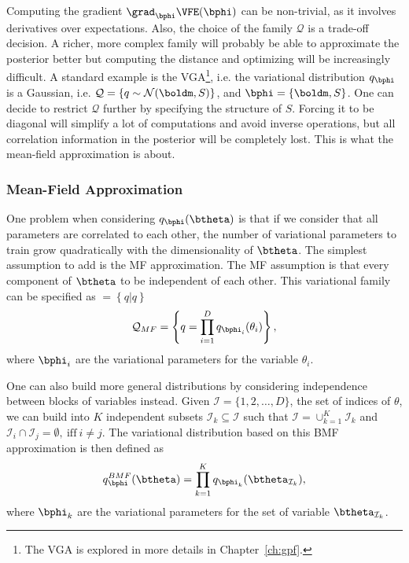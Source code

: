 Computing the gradient $\grad_{\bphi}\VFE(\bphi)$ can be non-trivial, as it involves derivatives over expectations.
Also, the choice of the family $\mathcal{Q}$ is a trade-off decision.
A richer, more complex family will probably be able to approximate the posterior better but computing the distance and optimizing will be increasingly difficult.
A standard example is the \ac{VGA}\footnote{The \ac{VGA} is explored in more details in Chapter~\ref{ch:gpf}.}, i.e. the variational distribution $q_{\bphi}$ is a Gaussian, i.e. $\mathcal{Q} = \left\{q \sim \mathcal{N}(\boldm, S)\right\}$, and $\bphi = \{\boldm, S\}$.
One can decide to restrict $\mathcal{Q}$ further by specifying the structure of $S$.
Forcing it to be diagonal will simplify a lot of computations and avoid inverse operations, but all correlation information in the posterior will be completely lost.
This is what the mean-field approximation is about.

\subsubsection{Mean-Field Approximation}

One problem when considering $q_{\bphi}(\btheta)$ is that if we consider that all parameters are correlated to each other, the number of variational parameters to train grow quadratically with the dimensionality of $\btheta$.
The simplest assumption to add is the \ac{MF} approximation.
The \ac{MF} assumption is that every component of $\btheta$ to be independent of each other.
This variational family can be specified as $ = \left\{q | q \right\}$
\begin{align}
    \mathcal{Q}_{MF}= \left\{q = \prod_{i=1}^D q_{\bphi_i}(\theta_i)\right\},
\end{align}
where $\bphi_i$ are the variational parameters for the variable $\theta_i$.

One can also build more general distributions by considering independence between blocks of variables instead.
Given $\mathcal{I}=\{1,2,\ldots,D\}$, the set of indices of $\theta$, we can build into $K$ independent subsets $\mathcal{I}_k \subseteq \mathcal{I}$ such that  $\mathcal{I} = \cup_{k=1}^K \mathcal{I}_{k}$ and $\mathcal{I}_i \cap \mathcal{I}_j=\emptyset,~\mathrm{iff}~i \neq j$.
The variational distribution based on this \ac{BMF} approximation is then defined as
\begin{align}
    q^{BMF}_{\bphi}(\btheta) = \prod_{k=1}^K q_{\bphi_k}(\btheta_{\mathcal{I}_k}),
\end{align}
where $\bphi_k$ are the variational parameters for the set of variable $\btheta_{\mathcal{I}_k}$.

